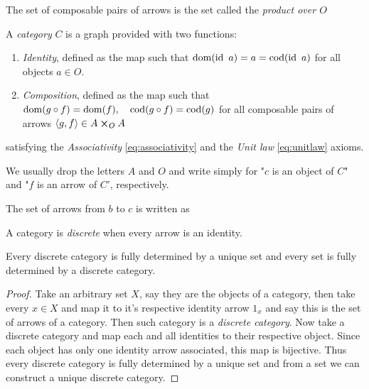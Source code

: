 \documentclass[oneside, 10pt, notitlepage]{book}
\begin{document}
\begin{definition}
	The set of composable pairs of arrows is the set
	called the \emph{product over \(O\)}
\end{definition}

\begin{definition}[Category]
	A \emph{category} \(C\) is a graph provided with two functions:
	\begin{enumerate}
		\item \emph{Identity}, defined as the map
		such that \(\operatorname{dom}(\operatorname{id}\ a) = a = \operatorname{cod}(\operatorname{id}\ a)\) for all objects \(a\in O\).
		\item \emph{Composition}, defined as the map
		such that \(\dom{g\circ f} = \dom{f} \qcomma \cod{g\circ f}=\cod{g}\) for all composable pairs of arrows \(\left\langle g,f \right\rangle\in A\cross_O A\)
	\end{enumerate}
	satisfying the \emph{Associativity} \eqref{eq:associativity} and the \emph{Unit law} \eqref{eq:unitlaw} axioms.
\end{definition}

\begin{remark}
We usually drop the letters \(A\) and \(O\) and write simply
for "\(c\) is an object of \(C\)" and "\(f\) is an arrow of \(C\)', respectively.
\end{remark}

\begin{definition}
	The set of arrows from \(b\) to \(c\) is written as
\end{definition}

\begin{definition}
	A category is \emph{discrete} when every arrow is an identity.
\end{definition}

\begin{proposition}
	Every discrete category is fully determined by a unique set and every set is fully determined by a discrete category.
\end{proposition}
\begin{proof}
	Take an arbitrary set \(X\), say they are the objects of a category, then take every \(x\in X\) and map it to it's respective identity arrow \(1_x\) and say this is the set of arrows of a category. Then such category is a \emph{discrete category}. Now take a discrete category and map each and all identities to their respective object. Since each object has only one identity arrow associated, this map is bijective. Thus every discrete category is fully determined by a unique set and from a set we can construct a unique discrete category.
\end{proof}
\end{document}
